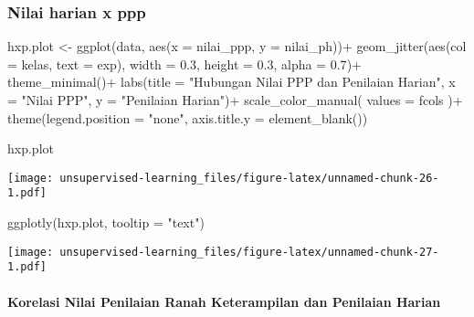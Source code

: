 \documentclass[
]{article}
\newenvironment{Shaded}{\begin{snugshade}}{\end{snugshade}}
\newcommand{\AttributeTok}[1]{\textcolor[rgb]{0.77,0.63,0.00}{#1}}
\newcommand{\FloatTok}[1]{\textcolor[rgb]{0.00,0.00,0.81}{#1}}
\newcommand{\FunctionTok}[1]{\textcolor[rgb]{0.00,0.00,0.00}{#1}}
\newcommand{\NormalTok}[1]{#1}
\newcommand{\OtherTok}[1]{\textcolor[rgb]{0.56,0.35,0.01}{#1}}
\newcommand{\SpecialCharTok}[1]{\textcolor[rgb]{0.00,0.00,0.00}{#1}}
\newcommand{\StringTok}[1]{\textcolor[rgb]{0.31,0.60,0.02}{#1}}
\begin{document}
\hypertarget{nilai-harian-x-ppp}{%
\subsubsection{Nilai harian x ppp}\label{nilai-harian-x-ppp}}

\begin{Shaded}
\begin{Highlighting}[]
\NormalTok{hxp.plot }\OtherTok{\textless{}{-}} 
  \FunctionTok{ggplot}\NormalTok{(data, }
         \FunctionTok{aes}\NormalTok{(}\AttributeTok{x =}\NormalTok{ nilai\_ppp, }
             \AttributeTok{y =}\NormalTok{ nilai\_ph))}\SpecialCharTok{+}
  \FunctionTok{geom\_jitter}\NormalTok{(}\FunctionTok{aes}\NormalTok{(}\AttributeTok{col =}\NormalTok{ kelas,}
                  \AttributeTok{text =}\NormalTok{ exp),}
              \AttributeTok{width =} \FloatTok{0.3}\NormalTok{, }
              \AttributeTok{height =} \FloatTok{0.3}\NormalTok{, }
              \AttributeTok{alpha =} \FloatTok{0.7}\NormalTok{)}\SpecialCharTok{+}
  \FunctionTok{theme\_minimal}\NormalTok{()}\SpecialCharTok{+}
  \FunctionTok{labs}\NormalTok{(}\AttributeTok{title =} \StringTok{"Hubungan Nilai PPP dan Penilaian Harian"}\NormalTok{,}
       \AttributeTok{x =} \StringTok{"Nilai PPP"}\NormalTok{,}
       \AttributeTok{y =} \StringTok{"Penilaian Harian"}\NormalTok{)}\SpecialCharTok{+}
    \FunctionTok{scale\_color\_manual}\NormalTok{(}
    \AttributeTok{values =}\NormalTok{ fcols      }
\NormalTok{  )}\SpecialCharTok{+}
  \FunctionTok{theme}\NormalTok{(}\AttributeTok{legend.position =} \StringTok{"none"}\NormalTok{,}
        \AttributeTok{axis.title.y =} \FunctionTok{element\_blank}\NormalTok{())}

  

\NormalTok{hxp.plot}
\end{Highlighting}
\end{Shaded}

\texttt{[image: unsupervised-learning\_files/figure-latex/unnamed-chunk-26-1.pdf]}

\begin{Shaded}
\begin{Highlighting}[]
\FunctionTok{ggplotly}\NormalTok{(hxp.plot, }\AttributeTok{tooltip =} \StringTok{"text"}\NormalTok{)}
\end{Highlighting}
\end{Shaded}

\texttt{[image: unsupervised-learning\_files/figure-latex/unnamed-chunk-27-1.pdf]}

\hypertarget{korelasi-nilai-penilaian-ranah-keterampilan-dan-penilaian-harian}{%
\paragraph{Korelasi Nilai Penilaian Ranah Keterampilan dan Penilaian
Harian}\label{korelasi-nilai-penilaian-ranah-keterampilan-dan-penilaian-harian}}
\end{document}
